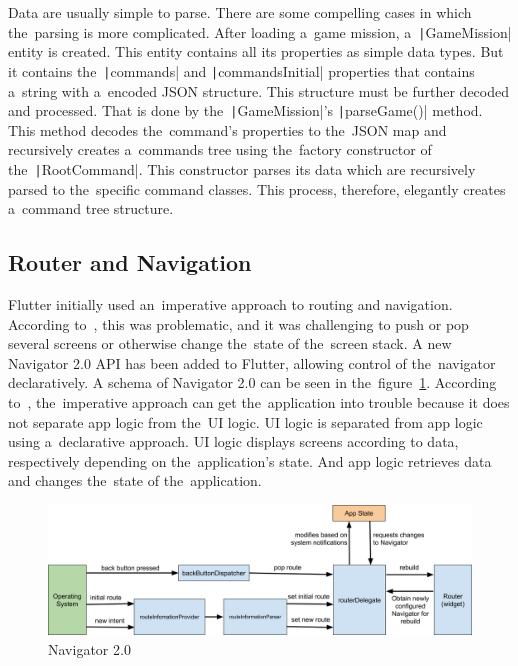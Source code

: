 Data are usually simple to parse.
There are some compelling cases in which the~parsing is more complicated.
After loading a~game mission, a~\texttt|GameMission| entity is created.
This entity contains all its properties as simple data types.
But it contains the~\texttt|commands| and \texttt|commandsInitial| properties that contains a~string with a~encoded JSON structure.
This structure must be further decoded and processed.
That is done by the~\texttt|GameMission|'s \texttt|parseGame()| method.
This method decodes the~command's properties to the~JSON map and recursively creates a~commands tree using the~factory constructor of the~\texttt|RootCommand|.
This constructor parses its data which are recursively parsed to the~specific command classes.
This process, therefore, elegantly creates a~command tree structure.

\subsection{Router and Navigation}

Flutter initially used an~imperative approach to routing and navigation.
\linebreak
According to~\cite{ryan_2020_navigator}, this was problematic, and it was challenging to push or pop several screens or otherwise change the~state of the~screen stack.
A new Navigator 2.0 API has been added to Flutter, allowing control of the~navigator declaratively.
A schema of Navigator 2.0 can be seen in the~figure~\ref{fig:navigator}.
\linebreak
According to~\cite{kietay_2021_navigator}, the~imperative approach can get the~application into trouble because it does not separate app logic from the~UI logic.
UI logic is separated from app logic using a~declarative approach.
UI logic displays screens according to data, respectively depending on the~application's state.
And app logic retrieves data and changes the~state of the~application.

\begin{figure}
    \centering
    \includegraphics[width=1\linewidth]{assets/implementation/navigator.png}
    \caption{Navigator 2.0~\cite{ryan_2020_navigator}}
    \label{fig:navigator}
\end{figure}

